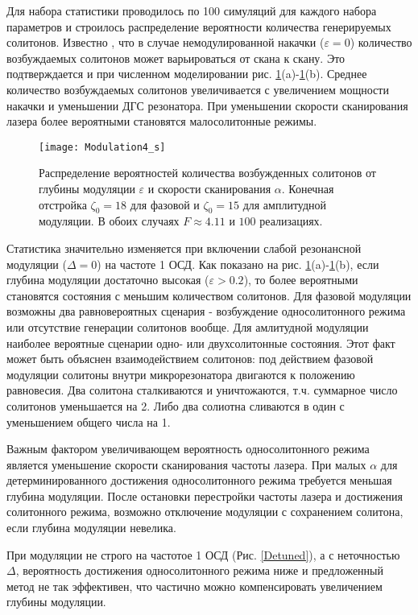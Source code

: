 Для набора статистики проводилось по 100 симуляций для каждого набора параметров и строилось распределение вероятности количества генерируемых солитонов. Известно \cite{Herr2014, Karpov2016}, что в случае немодулированной накачки ($\varepsilon=0$) количество возбуждаемых солитонов может варьироваться от скана к скану. Это подтверждается и при численном моделировании рис. \ref{Mod4}(a)-\ref{Mod4}(b). Среднее количество возбуждаемых солитонов увеличивается с увеличением мощности накачки и уменьшении ДГС резонатора. При уменьшении скорости сканирования лазера более вероятными становятся малосолитонные режимы.

\begin{figure}[ht]
\centering
  \texttt{[image: Modulation4\_s]}
  \caption{Распределение вероятностей количества возбужденных солитонов от глубины модуляции $\varepsilon$ и скорости сканирования $\alpha$. Конечная отстройка $\zeta_0=18$ для фазовой и $\zeta_0=15$ для амплитудной модуляции. В обоих случаях $F\approx 4.11$ и $100$ реализациях.}
  \label{Mod4}
\end{figure}

Статистика значительно изменяется при включении слабой резонансной модуляции ($\Delta=0$) на частоте 1 ОСД. Как показано на рис. \ref{Mod4}(a)-\ref{Mod4}(b), если глубина модуляции достаточно высокая ($\varepsilon> 0.2$), то более вероятными становятся состояния с меньшим количеством солитонов. Для фазовой модуляции возможны два равновероятных сценария - возбуждение односолитонного режима или отсутствие генерации солитонов вообще. Для амлитудной модуляции наиболее вероятные сценарии одно- или двухсолитонные состояния. Этот факт может быть объяснен взаимодействием солитонов: под действием фазовой модуляции солитоны внутри микрорезонатора двигаются к положению равновесия. Два солитона сталкиваются и уничтожаются, т.ч. суммарное число солитонов уменьшается на 2. Либо два солиотна сливаются в один с уменьшением общего числа на 1.

Важным фактором увеличивающем вероятность односолитонного режима является уменьшение скорости сканирования частоты лазера. При малых $\alpha$ для детерминированного достижения односолитонного режима требуется меньшая глубина модуляции. После остановки перестройки частоты лазера и достижения солитонного режима, возможно отключение модуляции с сохранением солитона, если глубина модуляции невелика.

При модуляции не строго на частотое 1 ОСД (Рис. \ref{Detuned}), а с неточностью $\Delta$, вероятность достижения односолитонного режима ниже и предложенный метод не так эффективен, что частично можно компенсировать увеличением глубины модуляции.

